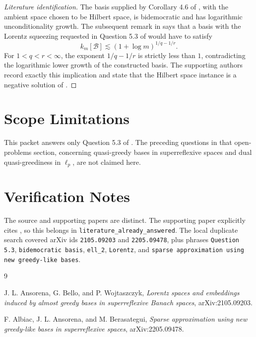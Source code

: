 \documentclass[11pt]{article}
\begin{document}
\begin{proof}[Literature identification]
The basis supplied by Corollary 4.6 of \cite{AAB}, with the ambient space
chosen to be Hilbert space, is bidemocratic and has logarithmic
unconditionality growth. The subsequent remark in \cite{AAB} says that a basis
with the Lorentz squeezing requested in Question 5.3 of \cite{ABW} would have
to satisfy
\[
k_m[\mathcal B]\lesssim (1+\log m)^{1/q-1/r}.
\]
For \(1<q<r<\infty\), the exponent \(1/q-1/r\) is strictly less than \(1\),
contradicting the logarithmic lower growth of the constructed basis. The
supporting authors record exactly this implication and state that the Hilbert
space instance is a negative solution of \cite[Question 5.3]{ABW}.
\end{proof}

\section*{Scope Limitations}

This packet answers only Question 5.3 of \cite{ABW}. The preceding questions
in that open-problems section, concerning quasi-greedy bases in
superreflexive spaces and dual quasi-greediness in \(\ell_p\), are not claimed
here.

\section*{Verification Notes}

The source and supporting papers are distinct. The supporting paper explicitly
cites \cite[Question 5.3]{ABW}, so this belongs in
\texttt{literature\_already\_answered}. The local duplicate search covered
arXiv ids \texttt{2105.09203} and \texttt{2205.09478}, plus phrases
\texttt{Question 5.3}, \texttt{bidemocratic basis}, \texttt{ell\_2},
\texttt{Lorentz}, and \texttt{sparse approximation using new greedy-like
bases}.

\begin{thebibliography}{9}

J. L. Ansorena, G. Bello, and P. Wojtaszczyk,
\emph{Lorentz spaces and embeddings induced by almost greedy bases in
superreflexive Banach spaces},
arXiv:2105.09203.

F. Albiac, J. L. Ansorena, and M. Berasategui,
\emph{Sparse approximation using new greedy-like bases in superreflexive
spaces},
arXiv:2205.09478.

\end{thebibliography}
\end{document}
